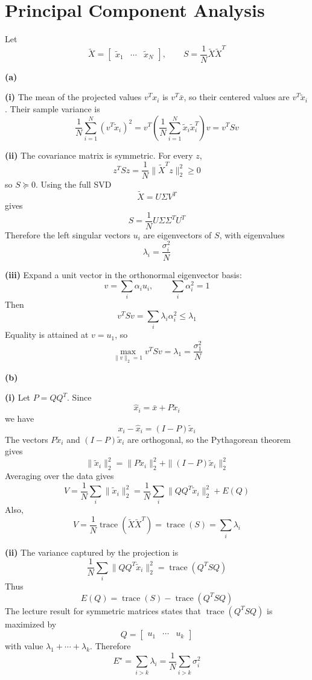 \section{Principal Component Analysis}

Let
\[
\widetilde X=
\begin{bmatrix}
\widetilde x_1&\cdots&\widetilde x_N
\end{bmatrix},
\qquad
S=\frac{1}{N}\widetilde X\widetilde X^T
\]

\textbf{(a)}

\textbf{(i)}
The mean of the projected values \(v^Tx_i\) is \(v^T\bar x\), so their
centered values are \(v^T\widetilde x_i\). Their sample variance is
\[
\frac{1}{N}\sum_{i=1}^N(v^T\widetilde x_i)^2
=
v^T\left(\frac{1}{N}\sum_{i=1}^N
\widetilde x_i\widetilde x_i^T\right)v
=v^TSv
\]

\textbf{(ii)}
The covariance matrix is symmetric. For every \(z\),
\[
z^TSz
=\frac{1}{N}\|\widetilde X^Tz\|_2^2
\geq0
\]
so \(S\succeq0\). Using the full SVD
\[
\widetilde X=U\Sigma V^T
\]
gives
\[
S
=\frac{1}{N}U\Sigma\Sigma^TU^T
\]
Therefore the left singular vectors \(u_i\) are eigenvectors of \(S\), with
eigenvalues
\[
\boxed{\lambda_i=\frac{\sigma_i^2}{N}}
\]

\textbf{(iii)}
Expand a unit vector in the orthonormal eigenvector basis:
\[
v=\sum_i\alpha_i u_i,
\qquad
\sum_i\alpha_i^2=1
\]
Then
\[
v^TSv=\sum_i\lambda_i\alpha_i^2\leq\lambda_1
\]
Equality is attained at \(v=u_1\), so
\[
\boxed{\max_{\|v\|_2=1}v^TSv
=\lambda_1=\frac{\sigma_1^2}{N}}
\]

\textbf{(b)}

\textbf{(i)}
Let \(P=QQ^T\). Since
\[
\widehat x_i=\bar x+P\widetilde x_i
\]
we have
\[
x_i-\widehat x_i=(I-P)\widetilde x_i
\]
The vectors \(P\widetilde x_i\) and \((I-P)\widetilde x_i\) are orthogonal,
so the Pythagorean theorem gives
\[
\|\widetilde x_i\|_2^2
=\|P\widetilde x_i\|_2^2
+\|(I-P)\widetilde x_i\|_2^2
\]
Averaging over the data gives
\[
V=\frac{1}{N}\sum_i\|\widetilde x_i\|_2^2
=\frac{1}{N}\sum_i\|QQ^T\widetilde x_i\|_2^2+E(Q)
\]
Also,
\[
V
=\frac{1}{N}\operatorname{trace}(\widetilde X\widetilde X^T)
=\operatorname{trace}(S)
=\sum_i\lambda_i
\]

\textbf{(ii)}
The variance captured by the projection is
\[
\frac{1}{N}\sum_i\|QQ^T\widetilde x_i\|_2^2
=\operatorname{trace}(Q^TSQ)
\]
Thus
\[
E(Q)=\operatorname{trace}(S)-\operatorname{trace}(Q^TSQ)
\]
The lecture result for symmetric matrices states that
\(\operatorname{trace}(Q^TSQ)\) is maximized by
\[
Q=
\begin{bmatrix}
u_1&\cdots&u_k
\end{bmatrix}
\]
with value \(\lambda_1+\cdots+\lambda_k\). Therefore
\[
\boxed{E^\star
=\sum_{i>k}\lambda_i
=\frac{1}{N}\sum_{i>k}\sigma_i^2}
\]

